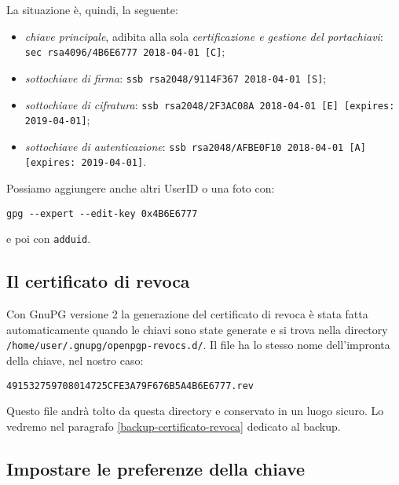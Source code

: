 La situazione è, quindi, la seguente:

\begin{itemize}
    \item \emph{chiave principale}, adibita alla sola \emph{certificazione e
    gestione del portachiavi}: \newline \texttt{sec   rsa4096/4B6E6777 2018-04-01
    [C]};
    \item \emph{sottochiave di firma}: \newline \texttt{ssb   rsa2048/9114F367
    2018-04-01 [S]};
    \item \emph{sottochiave di cifratura}: \newline \texttt{ssb
    rsa2048/2F3AC08A 2018-04-01 [E] [expires: 2019-04-01]};
    \item \emph{sottochiave di autenticazione}: \newline \texttt{ssb
    rsa2048/AFBE0F10 2018-04-01 [A] [expires: 2019-04-01]}.
\end{itemize}

Possiamo aggiungere anche altri UserID o una foto con:

\begin{lstlisting}
gpg --expert --edit-key 0x4B6E6777
\end{lstlisting}

e poi con \texttt{adduid}.

\subsection{Il certificato di revoca}
\label{certificato-revoca}

Con GnuPG versione 2 la generazione del certificato di revoca è stata fatta
automaticamente quando le chiavi sono state generate e si trova nella
directory \texttt{/home/user/.gnupg/openpgp-revocs.d/}. Il file ha lo
stesso nome dell'impronta della chiave, nel nostro caso:

\begin{lstlisting}
491532759708014725CFE3A79F676B5A4B6E6777.rev
\end{lstlisting}

Questo file andrà tolto da questa directory e conservato in un luogo sicuro. Lo
vedremo nel paragrafo \vref{backup-certificato-revoca} dedicato al backup.

\subsection{Impostare le preferenze della chiave}

